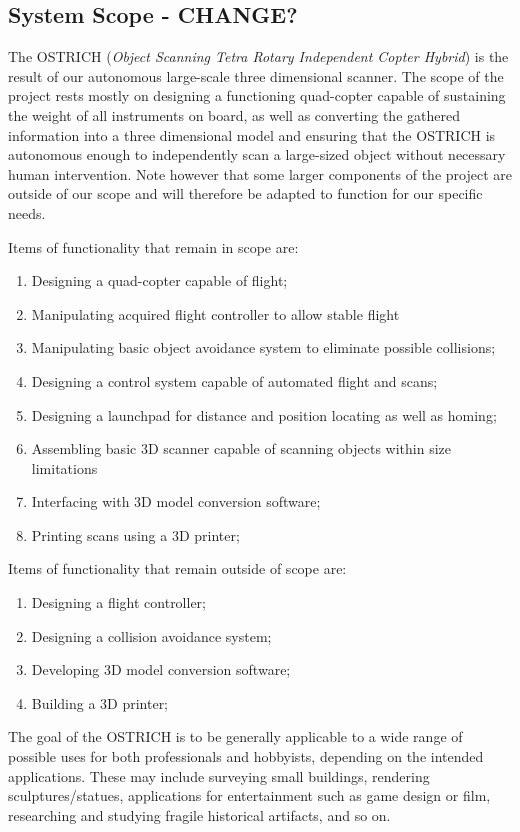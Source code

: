 \documentclass[10pt,letterpaper]{article}
\begin{document}
\subsection{System Scope - CHANGE?}
The OSTRICH (\textit{Object Scanning Tetra Rotary Independent Copter Hybrid}) is the result of our autonomous large-scale three dimensional scanner. The scope of the project rests mostly on designing a functioning quad-copter capable of sustaining the weight of all instruments on board, as well as converting the gathered information into a three dimensional model and ensuring that the OSTRICH is autonomous enough to independently scan a large-sized object without necessary human intervention. Note however that some larger components of the project are outside of our scope and will therefore be adapted to function for our specific needs. \par 
Items of functionality that remain in scope are: 
\begin{enumerate}
	\item Designing a quad-copter capable of flight;
    \item Manipulating acquired flight controller to allow stable flight
    \item Manipulating basic object avoidance system to eliminate possible collisions;
    \item Designing a control system capable of automated flight and scans; 
    \item Designing a launchpad for distance and position locating as well as homing;
    \item Assembling basic 3D scanner capable of scanning objects within size limitations
    \item Interfacing with 3D model conversion software;
    \item Printing scans using a 3D printer;
\end{enumerate}
Items of functionality that remain outside of scope are:
\begin{enumerate}
	\item Designing a flight controller;
    \item Designing a collision avoidance system;
    \item Developing 3D model conversion software;
    \item Building a 3D printer;
\end{enumerate}
The goal of the OSTRICH is to be generally applicable to a wide range of possible uses for both professionals and hobbyists, depending on the intended applications. These may include surveying small buildings, rendering sculptures/statues, applications for entertainment such as game design or film, researching and studying fragile historical artifacts, and so on. 
\end{document}
